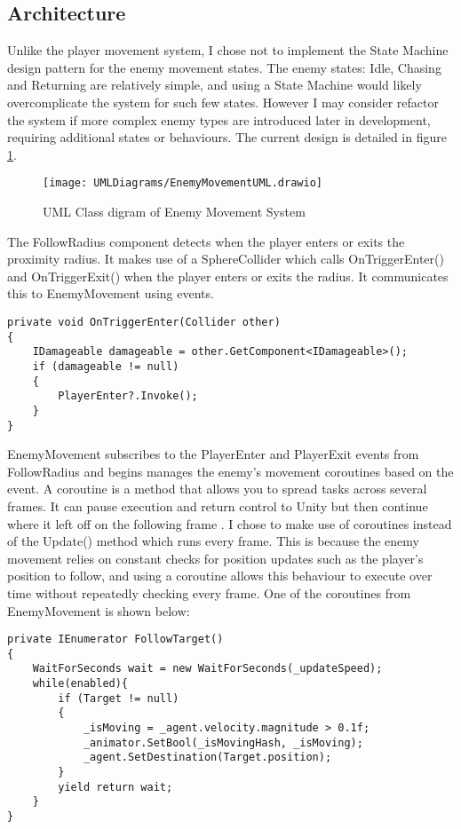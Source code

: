 \documentclass[]{final_report}
\begin{document}
\subsection{Architecture}
Unlike the player movement system, I chose not to implement the State Machine design pattern for the enemy movement states. The enemy states: Idle, Chasing and Returning are relatively simple, and using a State Machine would likely overcomplicate the system for such few states. However I may consider refactor the system if more complex enemy types are introduced later in development, requiring additional states or behaviours. The current design is detailed in figure \ref{fig:label_enemyMovement}.
\begin{figure}[H]
    \centering
    \texttt{[image: UMLDiagrams/EnemyMovementUML.drawio]}
    \caption{UML Class digram of Enemy Movement System}
    \label{fig:label_enemyMovement}
\end{figure}
The FollowRadius component detects when the player enters or exits the proximity radius. It makes use of a SphereCollider which calls OnTriggerEnter() and OnTriggerExit() when the player enters or exits the radius. It communicates this to EnemyMovement using events. 
\begin{verbatim}
private void OnTriggerEnter(Collider other) 
{
    IDamageable damageable = other.GetComponent<IDamageable>();
    if (damageable != null)
    {
        PlayerEnter?.Invoke();
    }
}
\end{verbatim}
EnemyMovement subscribes to the PlayerEnter and PlayerExit events from FollowRadius and begins manages the enemy's movement coroutines based on the event. A coroutine is a method that allows you to spread tasks across several frames. It can pause execution and return control to Unity but then continue where it left off on the following frame \cite{unity2024_Coroutines}. I chose to make use of coroutines instead of the Update() method which runs every frame. This is because the enemy movement relies on constant checks for position updates such as the player's position to follow, and using a coroutine allows this behaviour to execute over time without repeatedly checking every frame. One of the coroutines from EnemyMovement is shown below:
\begin{verbatim}
private IEnumerator FollowTarget()
{
    WaitForSeconds wait = new WaitForSeconds(_updateSpeed);
    while(enabled){
        if (Target != null)
        {
            _isMoving = _agent.velocity.magnitude > 0.1f;
            _animator.SetBool(_isMovingHash, _isMoving);
            _agent.SetDestination(Target.position); 
        }
        yield return wait;
    }
}
\end{verbatim}
\end{document}
